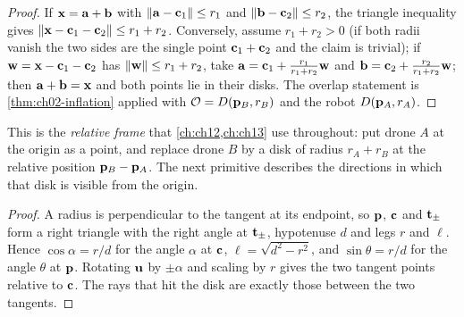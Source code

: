 \begin{proof}
If $\mathbf{x}=\mathbf{a}+\mathbf{b}$ with $\left\lVert \mathbf{a}-\mathbf{c}_1 \right\rVert\le r_1$ and $\left\lVert \mathbf{b}-\mathbf{c}_2 \right\rVert\le r_2$, the triangle inequality gives $\left\lVert \mathbf{x}-\mathbf{c}_1-\mathbf{c}_2 \right\rVert\le r_1+r_2$. Conversely, assume $r_1+r_2>0$ (if both radii vanish the two sides are the single point $\mathbf{c}_1+\mathbf{c}_2$ and the claim is trivial); if $\mathbf{w}=\mathbf{x}-\mathbf{c}_1-\mathbf{c}_2$ has $\left\lVert \mathbf{w} \right\rVert\le r_1+r_2$, take $\mathbf{a}=\mathbf{c}_1+\frac{r_1}{r_1+r_2}\mathbf{w}$ and $\mathbf{b}=\mathbf{c}_2+\frac{r_2}{r_1+r_2}\mathbf{w}$; then $\mathbf{a}+\mathbf{b}=\mathbf{x}$ and both points lie in their disks. The overlap statement is \cref{thm:ch02-inflation} applied with $\mathcal{O}=D(\mathbf{p}_B,r_B)$ and the robot $D(\mathbf{p}_A,r_A)$. \qedhere
\end{proof}

This is the \emph{relative frame} that \cref{ch:ch12,ch:ch13} use throughout: put drone $A$ at the origin as a point, and replace drone $B$ by a disk of radius $r_A+r_B$ at the relative position $\mathbf{p}_B-\mathbf{p}_A$. The next primitive describes the directions in which that disk is visible from the origin.

\begin{proof}
A radius is perpendicular to the tangent at its endpoint, so $\mathbf{p}$, $\mathbf{c}$ and $\mathbf{t}_{\pm}$ form a right triangle with the right angle at $\mathbf{t}_{\pm}$, hypotenuse $d$ and legs $r$ and $\ell$. Hence $\cos\alpha=r/d$ for the angle $\alpha$ at $\mathbf{c}$, $\ell=\sqrt{d^2-r^2}$, and $\sin\theta=r/d$ for the angle $\theta$ at $\mathbf{p}$. Rotating $\mathbf{u}$ by $\pm\alpha$ and scaling by $r$ gives the two tangent points relative to $\mathbf{c}$. The rays that hit the disk are exactly those between the two tangents. \qedhere
\end{proof}

